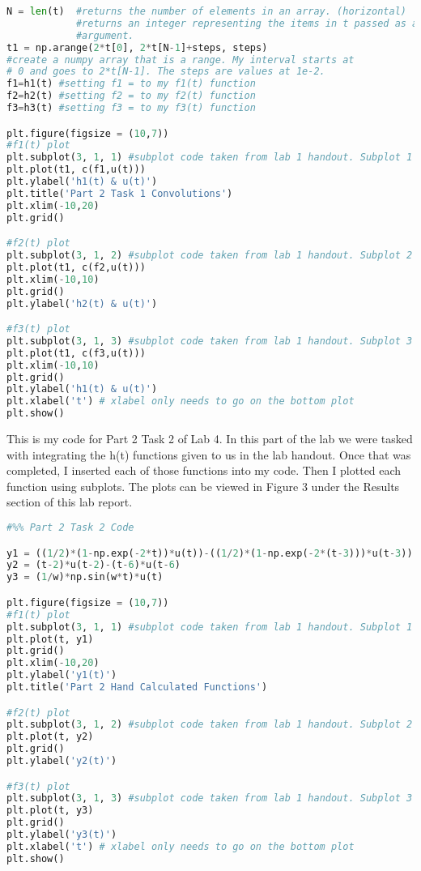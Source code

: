 \documentclass[12pt]{report}
\begin{document}
\begin{lstlisting}[language=Python]
N = len(t)  #returns the number of elements in an array. (horizontal)
            #returns an integer representing the items in t passed as an
            #argument.
t1 = np.arange(2*t[0], 2*t[N-1]+steps, steps)
#create a numpy array that is a range. My interval starts at
# 0 and goes to 2*t[N-1]. The steps are values at 1e-2.    
f1=h1(t) #setting f1 = to my f1(t) function
f2=h2(t) #setting f2 = to my f2(t) function
f3=h3(t) #setting f3 = to my f3(t) function

plt.figure(figsize = (10,7))
#f1(t) plot
plt.subplot(3, 1, 1) #subplot code taken from lab 1 handout. Subplot 1
plt.plot(t1, c(f1,u(t)))
plt.ylabel('h1(t) & u(t)')
plt.title('Part 2 Task 1 Convolutions')
plt.xlim(-10,20)
plt.grid()

#f2(t) plot
plt.subplot(3, 1, 2) #subplot code taken from lab 1 handout. Subplot 2
plt.plot(t1, c(f2,u(t)))
plt.xlim(-10,10)
plt.grid()
plt.ylabel('h2(t) & u(t)')

#f3(t) plot
plt.subplot(3, 1, 3) #subplot code taken from lab 1 handout. Subplot 3
plt.plot(t1, c(f3,u(t)))
plt.xlim(-10,10)
plt.grid()
plt.ylabel('h1(t) & u(t)')
plt.xlabel('t') # xlabel only needs to go on the bottom plot
plt.show()
\end{lstlisting}



{This is my code for Part 2 Task 2 of Lab 4. In this part of the lab we were tasked with integrating the h(t) functions given to us in the lab handout. Once that was completed, I inserted each of those functions into my code. Then I plotted each function using subplots. The plots can be viewed in Figure 3 under the Results section of this lab report. }
\begin{lstlisting}[language=Python]
#%% Part 2 Task 2 Code

y1 = ((1/2)*(1-np.exp(-2*t))*u(t))-((1/2)*(1-np.exp(-2*(t-3)))*u(t-3))
y2 = (t-2)*u(t-2)-(t-6)*u(t-6)
y3 = (1/w)*np.sin(w*t)*u(t)

plt.figure(figsize = (10,7))
#f1(t) plot
plt.subplot(3, 1, 1) #subplot code taken from lab 1 handout. Subplot 1
plt.plot(t, y1)
plt.grid()
plt.xlim(-10,20)
plt.ylabel('y1(t)')
plt.title('Part 2 Hand Calculated Functions')

#f2(t) plot
plt.subplot(3, 1, 2) #subplot code taken from lab 1 handout. Subplot 2
plt.plot(t, y2)
plt.grid()
plt.ylabel('y2(t)')

#f3(t) plot
plt.subplot(3, 1, 3) #subplot code taken from lab 1 handout. Subplot 3
plt.plot(t, y3)
plt.grid()
plt.ylabel('y3(t)')
plt.xlabel('t') # xlabel only needs to go on the bottom plot
plt.show()
\end{lstlisting}
\end{document}
